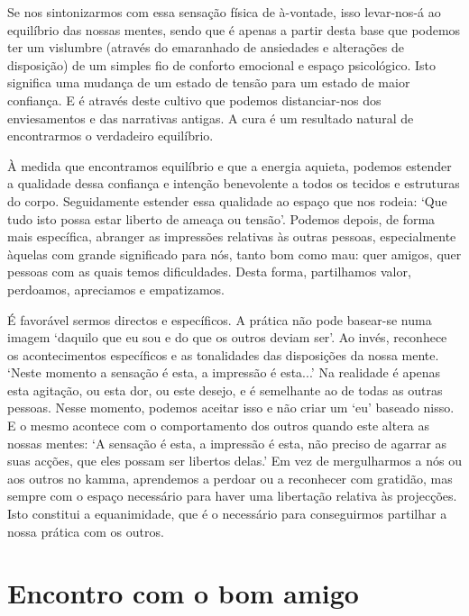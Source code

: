 Se nos sintonizarmos com essa sensação física de à-vontade, isso levar-nos-á ao equilíbrio das nossas mentes, sendo que é apenas a partir desta base que podemos ter um vislumbre (através do emaranhado de ansiedades e alterações de disposição) de um simples fio de conforto emocional e espaço psicológico. Isto significa uma mudança de um estado de tensão para um estado de maior confiança. E é através deste cultivo que podemos distanciar-nos dos enviesamentos e das narrativas antigas. A cura é um resultado natural de encontrarmos o verdadeiro equilíbrio.

À medida que encontramos equilíbrio e que a energia aquieta, podemos estender a qualidade dessa confiança e intenção benevolente a todos os tecidos e estruturas do corpo. Seguidamente estender essa qualidade ao espaço que nos rodeia: `Que tudo isto possa estar liberto de ameaça ou tensão'. Podemos depois, de forma mais específica, abranger as impressões relativas às outras pessoas, especialmente àquelas com grande significado para nós, tanto bom como mau: quer amigos, quer pessoas com as quais temos dificuldades. Desta forma, partilhamos valor, perdoamos, apreciamos e empatizamos.

É favorável sermos directos e específicos. A prática não pode basear-se numa imagem `daquilo que eu sou e do que os outros deviam ser'. Ao invés, reconhece os acontecimentos específicos e as tonalidades das disposições da nossa mente. `Neste momento a sensação é esta, a impressão é esta...' Na realidade é apenas esta agitação, ou esta dor, ou este desejo, e é semelhante ao de todas as outras pessoas. Nesse momento, podemos aceitar isso e não criar um `eu' baseado nisso. E o mesmo acontece com o comportamento dos outros quando este altera as nossas mentes: `A sensação é esta, a impressão é esta, não preciso de agarrar as suas acções, que eles possam ser libertos delas.' Em vez de mergulharmos a nós ou aos outros no kamma, aprendemos a perdoar ou a reconhecer com gratidão, mas sempre com o espaço necessário para haver uma libertação relativa às projecções. Isto constitui a equanimidade, que é o necessário para conseguirmos partilhar a nossa prática com os outros.

\section{Encontro com o bom amigo}


